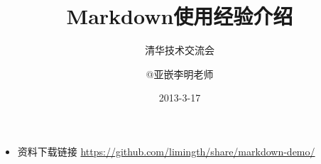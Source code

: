 \documentclass[10pt]{beamer}
\title{Markdown使用经验介绍}
\subtitle{清华技术交流会}
\author{@亚嵌李明老师}
\date{2013-3-17}
\institute{http://weibo.com/limingth}
\begin{document}
\begin{frame}
\titlepage
\begin{itemize}
\item 	资料下载链接 \url{https://github.com/limingth/share/markdown-demo/}
\end{itemize}
\end{frame}


\end{document}
